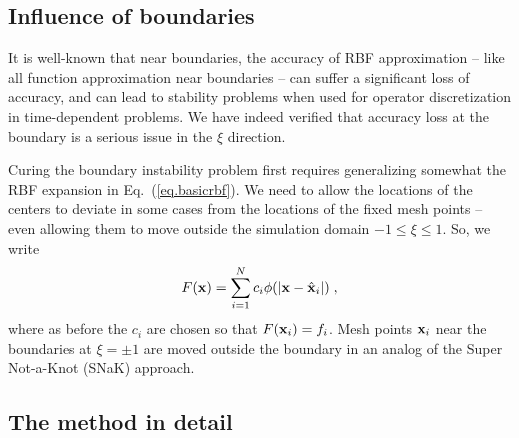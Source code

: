 \subsection{Influence of boundaries}

It is well-known that near boundaries, the accuracy of RBF 
approximation -- like all function approximation near boundaries -- 
can suffer a significant loss of accuracy, and can lead to 
stability problems when used for operator discretization in 
time-dependent problems.  We have indeed verified that accuracy 
loss at the boundary is a serious issue in the $\xi$ direction.

Curing the boundary instability problem first requires generalizing 
somewhat the RBF expansion in Eq.~(\ref{eq.basicrbf}).  We need to 
allow the locations of the centers to deviate in some cases from 
the locations of the fixed mesh points -- even allowing them to 
move outside the simulation domain $-1 \le \xi \le 1$.  So, we
write
%
\begin{equation}
F({\bf x}) = \sum_{i=1}^N c_i \phi(|{\bf x}-{\hat {\bf x}}_i|) \; ,
\label{eq.rbf}
\end{equation}
%
where as before the $c_i$ are chosen so that 
$F({\bf x}_i) = f_i$.  Mesh points ${\bf x}_i$ near the boundaries at 
$\xi = \pm 1$ are moved outside the boundary in an analog of
the Super Not-a-Knot (SNaK) approach.

\subsection{The method in detail}

